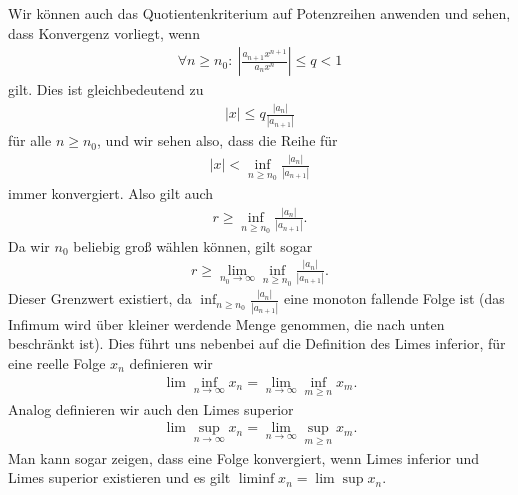 \documentclass[letterpaper,10pt,english]{jupyterBook}
\begin{document}
Wir können auch das Quotientenkriterium auf Potenzreihen anwenden und sehen, dass Konvergenz vorliegt, wenn
\begin{equation*}
\begin{split} \forall n \geq n_0: ~\left\vert \frac{a_{n+1} x^{n+1}}{a_n x^n} \right\vert \leq q < 1\end{split}
\end{equation*}
gilt. Dies ist gleichbedeutend zu
\begin{equation*}
\begin{split} |x| \leq q \frac{|a_n|}{|a_{n+1}|}\end{split}
\end{equation*}
für alle \(n \geq n_0\), und wir sehen also, dass die Reihe für
\begin{equation*}
\begin{split} |x|<\inf_{n \geq n_0} \frac{|a_n|}{|a_{n+1}|}\end{split}
\end{equation*}
immer konvergiert. Also gilt auch
\begin{equation*}
\begin{split} r \geq \inf_{n \geq n_0} \frac{|a_n|}{|a_{n+1}|} .\end{split}
\end{equation*}
Da wir \(n_0\) beliebig groß wählen können, gilt sogar
\begin{equation*}
\begin{split} r \geq \lim_{n_0 \rightarrow \infty} \inf_{n \geq n_0} \frac{|a_n|}{|a_{n+1}|} .\end{split}
\end{equation*}
Dieser Grenzwert existiert, da \( \inf_{n \geq n_0} \frac{|a_n|}{|a_{n+1}|}\) eine monoton fallende Folge ist (das Infimum wird über kleiner werdende Menge genommen, die nach unten beschränkt ist).
Dies führt uns nebenbei  auf die Definition des Limes inferior, für eine reelle Folge \(x_n\) definieren wir
\begin{equation*}
\begin{split} \lim\inf_{n \rightarrow \infty} x_n = \lim_{n \rightarrow \infty} \inf_{m \geq n} x_m .\end{split}
\end{equation*}
Analog definieren wir auch den Limes superior
\begin{equation*}
\begin{split} \lim\sup_{n \rightarrow \infty} x_n = \lim_{n \rightarrow \infty} \sup_{m \geq n} x_m .\end{split}
\end{equation*}
Man kann sogar zeigen, dass eine Folge konvergiert, wenn Limes inferior und Limes superior existieren und es gilt \(\liminf x_n = \lim\sup x_n\).
\end{document}
